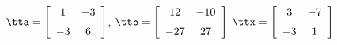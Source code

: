 {$\tta = \left[ \begin {array}{cc} 1&-3 \\ \noalign{\medskip} -3&6 \end {array} \right] $, 
 \quad
$\ttb=\left[ \begin {array}{cc} 12&-10\\ \noalign{\medskip} -27 & 27  \end {array} \right] $}
{$\ttx=\left[ \begin {array}{cc} 3&-7\\ \noalign{\medskip} -3&1  \end {array} \right] $}
